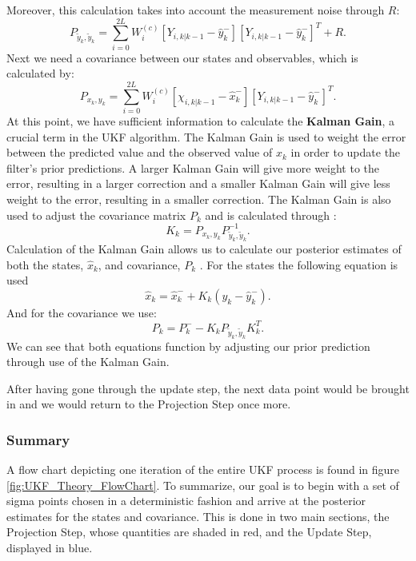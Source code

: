 \documentclass[review]{elsarticle}
\begin{document}
    Moreover, this calculation takes into account the measurement noise through $R$:
    \begin{equation}
    P_{\tilde{y}_k, \tilde{y}_k} = \sum_{i=0}^{2L} W_i^{(c)} [Y_{i,k|k-1} - \hat{y}_k^-][Y_{i,k|k-1} - \hat{y}_k^-]^T + R. 
    \end{equation}
    Next we need a covariance between our states and observables, which is calculated by:
    \begin{equation}
    P_{{x}_k,{y}_k} = \sum_{i=0}^{2L} W_i^{(c)} [\chi_{i,k|k-1} - \hat{x}_k^-][Y_{i,k|k-1} - \hat{y}_k^-]^T.
    \end{equation}
    At this point, we have sufficient information to calculate the \textbf{Kalman Gain}, a crucial term in the UKF algorithm. The Kalman Gain is used to weight the error between the predicted value and the observed value of $x_k$ in order to update the filter's prior predictions. A larger Kalman Gain will give more weight to the error, resulting in a larger correction and a smaller Kalman Gain will give less weight to the error, resulting in a smaller correction. The Kalman Gain is also used to adjust the covariance matrix $P_k$ and is calculated through \cite{VanMereChapter}:
    \begin{equation}
    K_k = P_{x_k, y_k} P_{\tilde{y}_k, \tilde{y}_k}^{-1}. 
    \end{equation}
    Calculation of the Kalman Gain allows us to calculate our posterior estimates of both the states, $\hat{x}_k$, and covariance, $P_k$ \cite{VanMereChapter}. For the states the following equation is used
    \begin{equation}
    \hat{x}_k = \hat{x}_k^- + K_k(y_k - \hat{y}_k^-). 
    \end{equation}
    And for the covariance we use:
    \begin{equation} \label{eq:27ukf}
    P_k = P_k^-  - K_k P_{\tilde{y}_k, \tilde{y}_k} K_k^T.
    \end{equation}
    We can see that both equations function by adjusting our prior prediction through use of the Kalman Gain.
    
    After having gone through the update step, the next data point would be brought in and we would return to the Projection Step once more.
    \subsubsection{Summary}
    A flow chart depicting one iteration of the entire UKF process is found in figure \ref{fig:UKF_Theory_FlowChart}. To summarize, our goal is to begin with a set of sigma points chosen in a deterministic fashion and arrive at the posterior estimates for the states and covariance. This is done in two main sections, the Projection Step, whose quantities are shaded in red, and the Update Step, displayed in blue.
    
\end{document}
